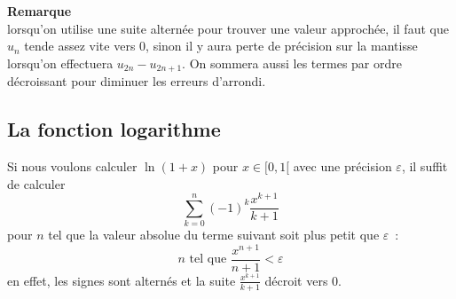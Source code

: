 \documentclass[a4paper,11pt]{article}
\begin{document}
\begin{giacjshere}
{\bf Remarque}\\
lorsqu'on utilise une suite altern\'ee pour
trouver une valeur approch\'ee, il faut que $u_n$ tende assez
vite vers 0, sinon il y aura perte de pr\'ecision sur la mantisse
lorsqu'on effectuera $u_{2n}-u_{2n+1}$. On sommera aussi les termes
par ordre d\'ecroissant pour diminuer les erreurs d'arrondi.

\subsection{La fonction logarithme}
Si nous voulons calculer $\ln(1+x)$ pour $x \in [0,1[$ avec une
pr\'ecision $\varepsilon$, il suffit de calculer
\[ \sum_{k=0}^n (-1)^k \frac{x^{k+1}}{k+1}\]
pour $n$ tel que la valeur absolue du terme suivant soit plus petit 
que $\varepsilon$~:
\[ n \mbox{ tel que } \frac{x^{n+1}}{n+1} < \varepsilon \]
en effet, les signes sont altern\'es et la suite $\frac{x^{k+1}}{k+1}$
d\'ecroit vers 0.


\end{giacjshere}
\end{document}
